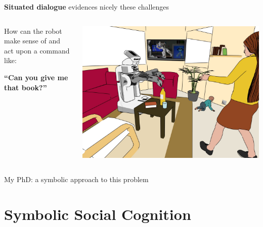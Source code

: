 \documentclass[compress]{beamer}
\begin{document}
\begin{frame}[plain]

    \centering
    {\bf Situated dialogue} evidences nicely these challenges

    \begin{columns}
        \begin{column}{0.5\linewidth}
            How can the robot make sense of and act upon a command like:
            \vspace{2em}

            \bf
            ``Can you give me that book?''
        \end{column}
        \begin{column}{0.5\linewidth}
            \begin{center}
                \includegraphics[width=\linewidth]{pr2-baby-3}
            \end{center}
        \end{column}
    \end{columns}

    \pause

    \vspace{2em}
    My PhD: a symbolic approach to this problem
\end{frame}

\section{Symbolic Social Cognition}

\end{document}
